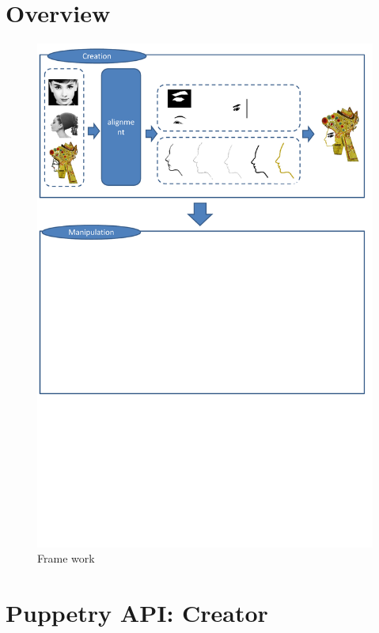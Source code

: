 \documentclass[letter]{sig-alternate}
\begin{document}
\section{Overview}

\begin{figure}[t]
\begin{center}
\includegraphics[scale=0.35]{figure/framework.pdf}
\caption{\small{Frame work}}
\label{fig:firstfig}
\end{center}
\end{figure}



\section{Puppetry API:  Creator}
\end{document}
